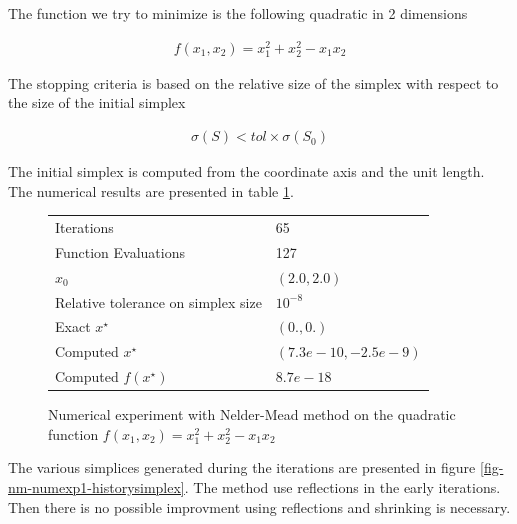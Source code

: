 The function we try to minimize is the following quadratic 
in 2 dimensions 

\begin{eqnarray}
f(x_1,x_2) = x_1^2 + x_2^2 - x_1 x_2
\end{eqnarray}

The stopping criteria is based on the relative size of the simplex 
with respect to the size of the initial simplex 

\begin{eqnarray}
\sigma(S) < tol \times \sigma(S_0)
\end{eqnarray}

The initial simplex is computed from the coordinate axis and the unit length.
The numerical results are presented in table \ref{fig-nm-numexp1-table}.

\begin{figure}[htbp]
\begin{center}
\begin{tiny}
\begin{tabular}{|l|l|}
\hline
Iterations & 65 \\
Function Evaluations & 127 \\
$x_0$ & $(2.0,2.0)$ \\
Relative tolerance on simplex size & $10^{-8}$ \\
Exact $x^\star$ & $(0.,0.)$\\
Computed $x^\star$ & $(7.3e-10 , -2.5e-9)$\\
Computed $f(x^\star)$ & $8.7e-18$\\
\hline
\end{tabular}
\end{tiny}
\end{center}
\caption{Numerical experiment with Nelder-Mead method on the quadratic function
$f(x_1,x_2) = x_1^2 + x_2^2 - x_1 x_2$}
\label{fig-nm-numexp1-table}
\end{figure}


The various simplices generated during the iterations are 
presented in figure \ref{fig-nm-numexp1-historysimplex}.
The method use reflections in the early iterations. Then there
is no possible improvment using reflections and shrinking is necessary.

